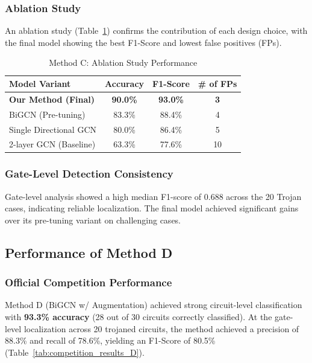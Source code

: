\documentclass[conference]{IEEEtran}
\begin{document}
\subsubsection{Ablation Study}
An ablation study (Table~\ref{tab:ablation_study_C}) confirms the contribution of each design choice, with the final model showing the best F1-Score and lowest false positives (FPs).

\begin{table}[h!]
    \centering
    \caption{Method C: Ablation Study Performance}
    \label{tab:ablation_study_C}
    \begin{tabular}{lccc}
        \toprule
        \textbf{Model Variant} & \textbf{Accuracy} & \textbf{F1-Score} & \textbf{\# of FPs} \\
        \midrule
        \textbf{Our Method (Final)} & \textbf{90.0\%} & \textbf{93.0\%} & \textbf{3} \\
        BiGCN (Pre-tuning) & 83.3\% & 88.4\% & 4 \\
        Single Directional GCN & 80.0\% & 86.4\% & 5 \\
        2-layer GCN (Baseline) & 63.3\% & 77.6\% & 10 \\
        \bottomrule
    \end{tabular}
\end{table}

\subsubsection{Gate-Level Detection Consistency}
Gate-level analysis showed a high median F1-score of 0.688 across the 20 Trojan cases, indicating reliable localization. The final model achieved significant gains over its pre-tuning variant on challenging cases.

\subsection{Performance of Method D}
\subsubsection{Official Competition Performance}
Method D (BiGCN w/ Augmentation) achieved strong circuit-level classification with \textbf{93.3\% accuracy} (28 out of 30 circuits correctly classified). At the gate-level localization across 20 trojaned circuits, the method achieved a precision of 88.3\% and recall of 78.6\%, yielding an F1-Score of 80.5\% (Table~\ref{tab:competition_results_D}).
\end{document}
